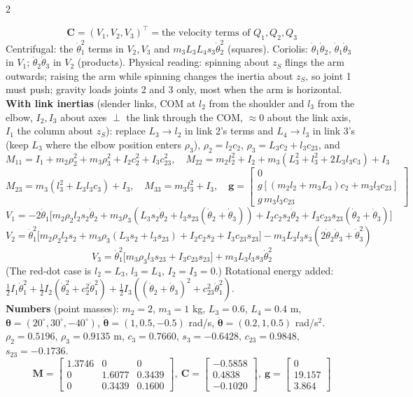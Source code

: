 \begin{multicols}{2}
\begin{examq}
\[\mathbf C=(V_1,V_2,V_3)^\top=\text{the velocity terms of }Q_1,Q_2,Q_3\]
Centrifugal: the $\dot\theta_1^2$ terms in $V_2,V_3$ and $m_3L_3L_4s_3\dot\theta_2^2$ (squares). Coriolis: $\dot\theta_1\dot\theta_2$, $\dot\theta_1\dot\theta_3$ in $V_1$; $\dot\theta_2\dot\theta_3$ in $V_2$ (products). Physical reading: spinning about $z_S$ flings the arm outwards; raising the arm while spinning changes the inertia about $z_S$, so joint 1 must push; gravity loads joints 2 and 3 only, most when the arm is horizontal.\\
\textbf{With link inertias} (slender links, COM at $l_2$ from the shoulder and $l_3$ from the elbow, $I_2,I_3$ about axes $\perp$ the link through the COM, $\approx0$ about the link axis, $I_1$ the column about $z_S$): replace $L_3\to l_2$ in link 2's terms and $L_4\to l_3$ in link 3's (keep $L_3$ where the elbow position enters $\rho_3$), $\rho_2=l_2c_2$, $\rho_3=L_3c_2+l_3c_{23}$, and
\[M_{11}=I_1+m_2\rho_2^2+m_3\rho_3^2+I_2c_2^2+I_3c_{23}^2,\quad M_{22}=m_2l_2^2+I_2+m_3(L_3^2+l_3^2+2L_3l_3c_3)+I_3\]
\[M_{23}=m_3(l_3^2+L_3l_3c_3)+I_3,\quad M_{33}=m_3l_3^2+I_3,\quad \mathbf g=\begin{bmatrix}0\\g[(m_2l_2+m_3L_3)c_2+m_3l_3c_{23}]\\g\,m_3l_3c_{23}\end{bmatrix}\]
\[V_1=-2\dot\theta_1\big[m_2\rho_2l_2s_2\dot\theta_2+m_3\rho_3(L_3s_2\dot\theta_2+l_3s_{23}(\dot\theta_2+\dot\theta_3))+I_2c_2s_2\dot\theta_2+I_3c_{23}s_{23}(\dot\theta_2+\dot\theta_3)\big]\]
\[V_2=\dot\theta_1^2\big[m_2\rho_2l_2s_2+m_3\rho_3(L_3s_2+l_3s_{23})+I_2c_2s_2+I_3c_{23}s_{23}\big]-m_3L_3l_3s_3(2\dot\theta_2\dot\theta_3+\dot\theta_3^2)\]
\[V_3=\dot\theta_1^2\big[m_3\rho_3l_3s_{23}+I_3c_{23}s_{23}\big]+m_3L_3l_3s_3\dot\theta_2^2\]
(The red-dot case is $l_2=L_3$, $l_3=L_4$, $I_2=I_3=0$.) Rotational energy added: $\tfrac12I_1\dot\theta_1^2+\tfrac12I_2(\dot\theta_2^2+c_2^2\dot\theta_1^2)+\tfrac12I_3((\dot\theta_2+\dot\theta_3)^2+c_{23}^2\dot\theta_1^2)$.\\
\textbf{Numbers} (point masses): $m_2=2$, $m_3=1$ kg, $L_3=0.6$, $L_4=0.4$ m, $\boldsymbol\theta=(20^\circ,30^\circ,-40^\circ)$, $\dot{\boldsymbol\theta}=(1,0.5,-0.5)$ rad/s, $\ddot{\boldsymbol\theta}=(0.2,1,0.5)$ rad/s$^2$. $\rho_2=0.5196$, $\rho_3=0.9135$ m, $c_3=0.7660$, $s_3=-0.6428$, $c_{23}=0.9848$, $s_{23}=-0.1736$.
\[\mathbf M=\begin{bmatrix}1.3746&0&0\\0&1.6077&0.3439\\0&0.3439&0.1600\end{bmatrix},\ \mathbf C=\begin{bmatrix}-0.5858\\0.4838\\-0.1020\end{bmatrix},\ \mathbf g=\begin{bmatrix}0\\19.157\\3.864\end{bmatrix}\]

\end{examq}
\end{multicols}
